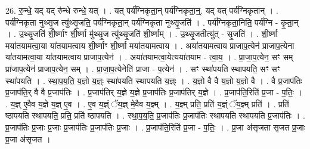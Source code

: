 \documentclass[17pt]{extarticle}
\begin{document}
26. रु॒न्धे॒ यद् यद् रु॑न्धे रुन्धे॒ यत् । . यत् पर्य॑ग्निकृता॒न् पर्य॑ग्निकृता॒न्॒. यद् यत् पर्य॑ग्निकृतान् । . पर्य॑ग्निकृता नुथ्सृ॒ज त्यु॑थ्सृ॒जति॒ पर्य॑ग्निकृता॒न् पर्य॑ग्निकृता नुथ्सृ॒जति॑ । . पर्य॑ग्निकृता॒निति॒ पर्य॑ग्नि - कृ॒ता॒न् । . उ॒थ्सृ॒जति॑ शी॒र्ष्णाꣳ शी॒र्ष्णा मु॑थ्सृ॒ज त्यु॑थ्सृ॒जति॑ शी॒र्ष्णाम् । . उ॒थ्सृ॒जतीत्यु॑त् - सृ॒जति॑ । . शी॒र्ष्णा मया॑तयामत्वा॒या या॑तयामत्वाय शी॒र्ष्णाꣳ शी॒र्ष्णा मया॑तयामत्वाय । . अया॑तयामत्वाय प्राजाप॒त्येन॑ प्राजाप॒त्येना या॑तयामत्वा॒या या॑तयामत्वाय प्राजाप॒त्येन॑ । . अया॑तयामत्वा॒येत्यया॑तयाम - त्वा॒य॒ । . प्रा॒जा॒प॒त्येन॒ सꣳ सम् प्रा॑जाप॒त्येन॑ प्राजाप॒त्येन॒ सम् । . प्रा॒जा॒प॒त्येनेति॑ प्राजा - प॒त्येन॑ । . सꣳ स्था॑पयति स्थापयति॒ सꣳ सꣳ स्था॑पयति । . स्था॒प॒य॒ति॒ य॒ज्ञो य॒ज्ञ्ः स्था॑पयति स्थापयति य॒ज्ञ्ः । . य॒ज्ञो वै वै य॒ज्ञो य॒ज्ञो वै । . वै प्र॒जाप॑तिः प्र॒जाप॑ति॒र् वै वै प्र॒जाप॑तिः । . प्र॒जाप॑तिर् य॒ज्ञे य॒ज्ञे प्र॒जाप॑तिः प्र॒जाप॑तिर् य॒ज्ञे । . प्र॒जाप॑ति॒रिति॑ प्र॒जा - प॒तिः॒ । . य॒ज्ञ् ए॒वैव य॒ज्ञे य॒ज्ञ् ए॒व । . ए॒व य॒ज्ञ्ं ॅय॒ज्ञ् मे॒वैव य॒ज्ञ्म् । . य॒ज्ञ्म् प्रति॒ प्रति॑ य॒ज्ञ्ं ॅय॒ज्ञ्म् प्रति॑ । . प्रति॑ ष्ठापयति स्थापयति॒ प्रति॒ प्रति॑ ष्ठापयति । . स्था॒प॒य॒ति॒ प्र॒जाप॑तिः प्र॒जाप॑तिः स्थापयति स्थापयति प्र॒जाप॑तिः । . प्र॒जाप॑तिः प्र॒जाः प्र॒जाः प्र॒जाप॑तिः प्र॒जाप॑तिः प्र॒जाः । . प्र॒जाप॑ति॒रिति॑ प्र॒जा - प॒तिः॒ । . प्र॒जा अ॑सृजता सृजत प्र॒जाः प्र॒जा अ॑सृजत । \newline
\end{document}
